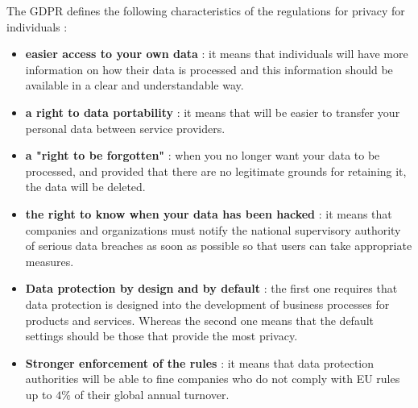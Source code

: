 The GDPR defines the following characteristics of the regulations for privacy for individuals :
\begin{itemize}
\item \textbf{easier access to your own data} : it means that individuals will have more information on how their data is processed and this information should be available in a clear and understandable way.
\item \textbf{a right to data portability} : it means that will be easier to transfer your personal data between service providers.
\item \textbf{a "right to be forgotten"} : when you no longer want your data to be processed, and provided that there are no legitimate grounds for retaining it, the data will be deleted.
\item \textbf{the right to know when your data has been hacked} : it means that companies and organizations must notify the national supervisory authority of serious data breaches as soon as possible so that users can take appropriate measures.
\item \textbf{Data protection by design and by default} : the first one requires that data protection is designed into the development of business processes for products and services. Whereas the second one means that the default settings should be those that provide the most privacy.
\item \textbf{Stronger enforcement of the rules} : it means that data protection authorities will be able to fine companies who do not comply with EU rules up to $4 \%$ of their global annual turnover.
\end{itemize}
